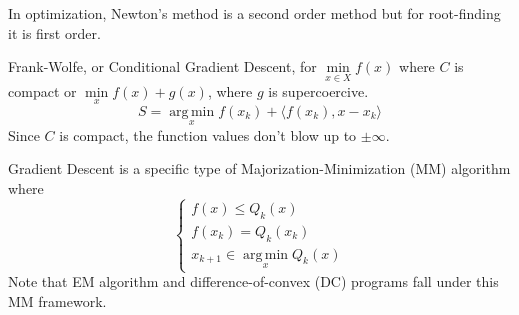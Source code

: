 \documentclass[english, 11pt]{article}
\DeclareMathOperator*{\argmin}{arg\,min}
\begin{document}
\begin{rem}
In optimization, Newton's method is a second order method but for root-finding it is first order.
\end{rem}


\begin{rem}
Frank-Wolfe, or Conditional Gradient Descent, for $\min \limits_{x \in X} f(x)$ where $C$ is compact or $\min \limits_x f(x) + g(x)$, where $g$ is supercoercive.
\[
S = \argmin \limits_x f(x_k) + \langle f(x_k), x - x_k \rangle
\]
Since $C$ is compact, the function values don't blow up to $\pm \infty$.
\end{rem}


\begin{rem}
Gradient Descent is a specific type of Majorization-Minimization (MM) algorithm where
\[
\begin{cases} f(x) \le Q_k(x) \\
f(x_k) = Q_k(x_k) \\
x_{k+1} \in \argmin \limits_x Q_k(x)
\end{cases}
\]
Note that EM algorithm and difference-of-convex (DC) programs fall under this MM framework.
\end{rem}
\end{document}
